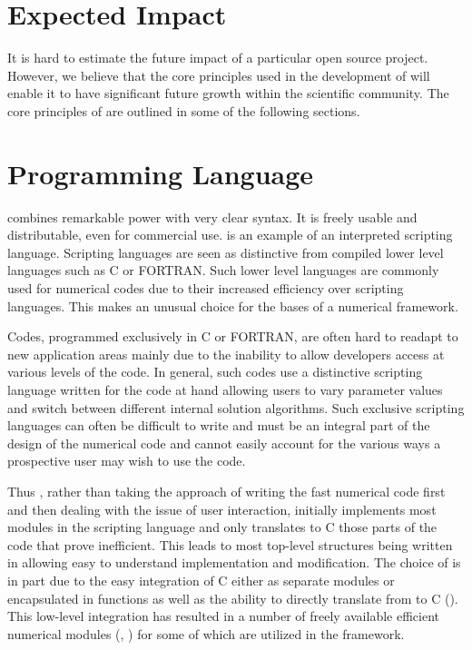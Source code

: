\section{Expected Impact}

It is hard to estimate the future impact of a particular open source
project. However, we believe that the core principles used in the development of
\FiPy{} will enable it to have significant future growth 
within the scientific community. The core principles of \FiPy{} are
outlined in some of the following sections.

\section{\Python{} Programming Language}

\Python{} combines remarkable power with very clear syntax. It is
freely usable and distributable, even for commercial use. \Python{} is
an example of an interpreted scripting language. Scripting languages
are seen as distinctive from compiled lower level languages such as C
or FORTRAN. Such lower level languages are commonly used for numerical
codes due to their increased efficiency over scripting languages. This
makes \Python{} an unusual choice for the bases of a numerical
framework.

Codes, programmed exclusively in C or FORTRAN, are often hard to
readapt to new application areas mainly due to the inability to allow
developers access at various levels of the code. In general, such
codes use a distinctive scripting language written for the code at
hand allowing users to vary parameter values and switch between
different internal solution algorithms. Such exclusive scripting
languages can often be difficult to write and must be an integral part
of the design of the numerical code and cannot easily account for the
various ways a prospective user may wish to use the code.

Thus \FiPy{}, rather than taking the approach of writing the fast
numerical code first and then dealing with the issue of user
interaction, initially implements most modules in the \Python{}
scripting language and only translates to C those parts of the code
that prove inefficient. This leads to most top-level structures being
written in \Python{} allowing easy to understand implementation and
modification. The choice of \Python{} is in part due to the easy
integration of C either as separate modules or encapsulated in
\Python{} functions as well as the ability to directly translate from
\Python{} to C (\PyRex{}). This low-level integration has resulted
in a number of freely available efficient numerical modules (\SciPy{},
\Numeric{}) for \Python{} some of which are utilized in the \FiPy{}
framework.

